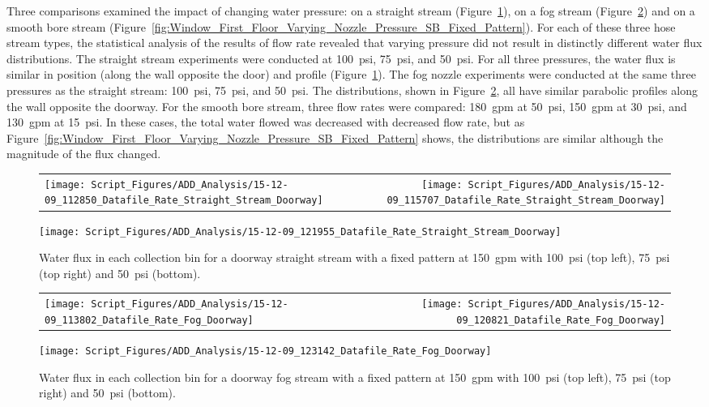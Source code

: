 \documentclass[12pt,oneside]{book}
\begin{document}
Three comparisons examined the impact of changing water pressure: on a straight stream (Figure~\ref{fig:Doorway_Varying_Nozzle_Pressure_SS_Fixed_Pattern}), on a fog stream (Figure~\ref{fig:Doorway_Varying_Nozzle_Pressure_Fog_Fixed_Pattern}) and on a smooth bore stream (Figure~\ref{fig:Window_First_Floor_Varying_Nozzle_Pressure_SB_Fixed_Pattern}). For each of these three hose stream types, the statistical analysis of the results of flow rate revealed that varying pressure did not result in distinctly different water flux distributions. The straight stream experiments were conducted at 100~psi, 75~psi, and 50~psi. For all three pressures, the water flux is similar in position (along the wall opposite the door) and profile (Figure~\ref{fig:Doorway_Varying_Nozzle_Pressure_SS_Fixed_Pattern}). The fog nozzle experiments were conducted at the same three pressures as the straight stream: 100~psi, 75~psi, and 50~psi. The distributions, shown in Figure~\ref{fig:Doorway_Varying_Nozzle_Pressure_Fog_Fixed_Pattern}, all have similar parabolic profiles along the wall opposite the doorway. For the smooth bore stream, three flow rates were compared: 180~gpm at 50~psi, 150~gpm at 30~psi, and 130~gpm at 15~psi. In these cases, the total water flowed was decreased with decreased flow rate, but as Figure~\ref{fig:Window_First_Floor_Varying_Nozzle_Pressure_SB_Fixed_Pattern} shows, the distributions are similar although the magnitude of the flux changed.

\begin{figure}[ht]
\begin{tabular*}{\textwidth}{lr}
\texttt{[image: Script\_Figures/ADD\_Analysis/15-12-09\_112850\_Datafile\_Rate\_Straight\_Stream\_Doorway]} &
\texttt{[image: Script\_Figures/ADD\_Analysis/15-12-09\_115707\_Datafile\_Rate\_Straight\_Stream\_Doorway]} \\
\end{tabular*}
\centering
\texttt{[image: Script\_Figures/ADD\_Analysis/15-12-09\_121955\_Datafile\_Rate\_Straight\_Stream\_Doorway]}
\caption[Water Flux Varying Pressure with Straight Stream]{Water flux in each collection bin for a doorway straight stream with a fixed pattern at 150~gpm with 100~psi (top left), 75~psi (top right) and 50~psi (bottom).}
\label{fig:Doorway_Varying_Nozzle_Pressure_SS_Fixed_Pattern}
\end{figure}

\begin{figure}[ht]
\begin{tabular*}{\textwidth}{lr}
\texttt{[image: Script\_Figures/ADD\_Analysis/15-12-09\_113802\_Datafile\_Rate\_Fog\_Doorway]} &
\texttt{[image: Script\_Figures/ADD\_Analysis/15-12-09\_120821\_Datafile\_Rate\_Fog\_Doorway]} \\
\end{tabular*}
\centering
\texttt{[image: Script\_Figures/ADD\_Analysis/15-12-09\_123142\_Datafile\_Rate\_Fog\_Doorway]}
\caption[Water Flux Varying Pressure with Fog Stream]{Water flux in each collection bin for a doorway fog stream with a fixed pattern at 150~gpm with 100~psi (top left), 75~psi (top right) and 50~psi (bottom).}
\label{fig:Doorway_Varying_Nozzle_Pressure_Fog_Fixed_Pattern}
\end{figure}
\end{document}
